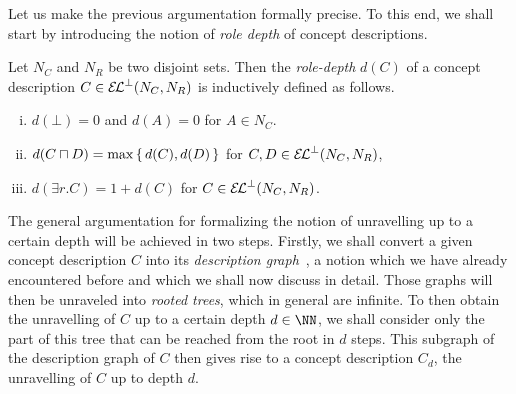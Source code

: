 Let us make the previous argumentation formally precise.  To this end, we shall start by
introducing the notion of \emph{role depth} of \ELbot concept descriptions.

\begin{Definition}
  \label{def:role-depth}
  Let $N_C$ and $N_R$ be two disjoint sets.  Then the \emph{role-depth} $d(C)$ of a
  concept description $C \in {\ensuremath{{\mathcal{E}\kern-.3ex\mathcal{L}}^\bot}}(N_C, N_R)$ is inductively defined as follows.
  \begin{enumerate}[i. ]
  \item $d(\bot) = 0$ and $d(A) = 0$ for $A \in N_C$.
  \item $d(C \sqcap D) = \max{\ensuremath{\{\,d(C), d(D)\,\}}}$ for $C, D \in {\ensuremath{{\mathcal{E}\kern-.3ex\mathcal{L}}^\bot}}(N_C, N_R)$,
  \item $d(\exists r. C) = 1 + d(C)$ for $C \in {\ensuremath{{\mathcal{E}\kern-.3ex\mathcal{L}}^\bot}}(N_C, N_R)$.
  \end{enumerate}
\end{Definition}

The general argumentation for formalizing the notion of unravelling up to a certain depth
will be achieved in two steps.  Firstly, we shall convert a given \ELgfp concept
description $C$ into its \emph{\EL description graph}~\cite{DBLP:conf/ijcai/Baader03a}, a
notion which we have already encountered before and which we shall now discuss in detail.
Those graphs will then be unraveled into \emph{rooted trees}, which in general are
infinite.  To then obtain the unravelling of $C$ up to a certain depth $d \in \NN$, we
shall consider only the part of this tree that can be reached from the root in $d$ steps.
This subgraph of the \EL description graph of $C$ then gives rise to a concept description
$C_d$, the unravelling of $C$ up to depth $d$.

